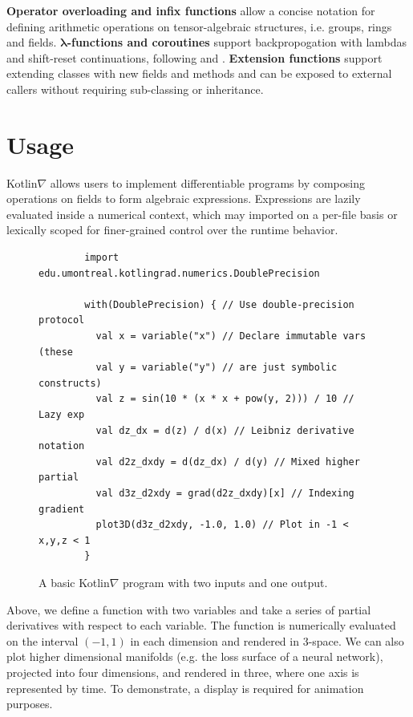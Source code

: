 \documentclass[12pt,initial,twoside,maitrise]{dms}
\numberwithin{equation}{section}
\numberwithin{table}{chapter}
\numberwithin{figure}{chapter}
\begin{document}
\textbf{Operator overloading and infix functions} allow a concise notation for defining arithmetic operations on tensor-algebraic structures, i.e. groups, rings and fields.
\textbf{$\mathbf{\lambda}$-functions and coroutines} support backpropogation with lambdas and shift-reset continuations, following \cite{pearlmutter2008reverse} and \cite{DBLP:journals-corr-abs-1803-10228}.
\textbf{Extension functions} support extending classes with new fields and methods and can be exposed to external callers without requiring sub-classing or inheritance.

\section{Usage}

Kotlin$\nabla$ allows users to implement differentiable programs by composing operations on fields to form algebraic expressions. Expressions are lazily evaluated inside a numerical context, which may imported on a per-file basis or lexically scoped for finer-grained control over the runtime behavior.

\begin{figure}[!htb]
    \begin{verbatim}
        import edu.umontreal.kotlingrad.numerics.DoublePrecision

        with(DoublePrecision) { // Use double-precision protocol
          val x = variable("x") // Declare immutable vars (these
          val y = variable("y") // are just symbolic constructs)
          val z = sin(10 * (x * x + pow(y, 2))) / 10 // Lazy exp
          val dz_dx = d(z) / d(x) // Leibniz derivative notation
          val d2z_dxdy = d(dz_dx) / d(y) // Mixed higher partial
          val d3z_d2xdy = grad(d2z_dxdy)[x] // Indexing gradient
          plot3D(d3z_d2xdy, -1.0, 1.0) // Plot in -1 < x,y,z < 1
        }
    \end{verbatim}

    \caption{A basic Kotlin$\nabla$ program with two inputs and one output.}
    \label{label:fig1}
\end{figure}

Above, we define a function with two variables and take a series of partial derivatives with respect to each variable. The function is numerically evaluated on the interval $(-1, 1)$ in each dimension and rendered in 3-space. We can also plot higher dimensional manifolds (e.g. the loss surface of a neural network), projected into four dimensions, and rendered in three, where one axis is represented by time. To demonstrate, a display is required for animation purposes.
\end{document}
